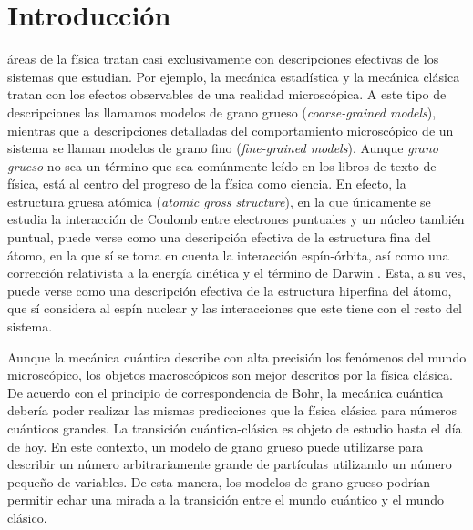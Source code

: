 \chapter{Introducción}



 áreas de la física tratan casi exclusivamente con descripciones efectivas de los sistemas que estudian. Por ejemplo, la mecánica estadística y la mecánica clásica tratan con los efectos observables de una realidad microscópica.   A este tipo de descripciones las llamamos modelos de grano grueso (\textit{coarse-grained models}), mientras que a descripciones detalladas del comportamiento microscópico de un sistema se llaman modelos de grano fino (\textit{fine-grained models}). Aunque \textit{grano grueso} no sea un término que sea comúnmente leído en los libros de texto de física, está al centro del progreso de la física como ciencia. En efecto, la estructura gruesa atómica (\textit{atomic gross structure}), en la que únicamente se estudia la interacción de Coulomb entre electrones puntuales y un núcleo también puntual, puede verse como una descripción efectiva de la estructura fina del átomo, en la que sí se toma en cuenta la interacción espín-órbita, así como una corrección relativista a la energía cinética y el término de Darwin \cite{Bransden}. Esta, a su ves, puede verse como una descripción efectiva de la estructura hiperfina del átomo, que sí considera al espín nuclear y las interacciones que este tiene con el resto del sistema.


Aunque la mecánica cuántica describe con alta precisión los fenómenos del mundo microscópico, los objetos macroscópicos son mejor descritos por la física clásica. De acuerdo con el principio de correspondencia de Bohr, la mecánica cuántica debería poder realizar las mismas predicciones que la física clásica para números cuánticos grandes. La transición cuántica-clásica es objeto de estudio hasta el día de hoy. En este contexto, un modelo de grano grueso puede utilizarse para describir un número arbitrariamente grande de partículas utilizando un número pequeño de variables. De esta manera, los modelos de grano grueso podrían permitir echar una mirada a la transición entre el mundo cuántico y el mundo clásico.

